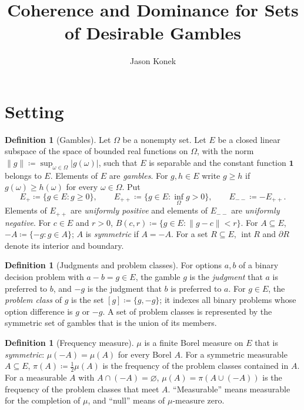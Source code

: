 \documentclass[11pt]{article}
\title{Coherence and Dominance for Sets of Desirable Gambles}
\author{Jason Konek}
\date{}
\theoremstyle{definition}
\newtheorem{definition}[theorem]{Definition}
\newcommand{\one}{\mathbf 1}
\newcommand{\interior}{\operatorname{int}}
\newcommand{\bd}{\partial}
\begin{document}
\maketitle


\section{Setting}\label{sec:setting}

\begin{definition}[Gambles]\label{def:gambles}
Let $\Omega$ be a nonempty set. Let $E$ be a closed linear subspace of the space of bounded real functions on $\Omega$, with the norm $\|g\|\coloneqq\sup_{\omega\in\Omega}|g(\omega)|$, such that $E$ is separable and the constant function $\one$ belongs to $E$. Elements of $E$ are \emph{gambles}. For $g,h\in E$ write $g\ge h$ if $g(\omega)\ge h(\omega)$ for every $\omega\in\Omega$. Put
\[
E_+\coloneqq\{g\in E:g\ge0\},\qquad E_{++}\coloneqq\{g\in E:\inf_{\Omega}g>0\},\qquad E_{--}\coloneqq -E_{++}.
\]
Elements of $E_{++}$ are \emph{uniformly positive} and elements of $E_{--}$ are \emph{uniformly negative}. For $c\in E$ and $r>0$, $B(c,r)\coloneqq\{g\in E:\|g-c\|<r\}$. For $A\subseteq E$, $-A\coloneqq\{-g:g\in A\}$; $A$ is \emph{symmetric} if $A=-A$. For a set $R\subseteq E$, $\interior R$ and $\bd R$ denote its interior and boundary.
\end{definition}

\begin{definition}[Judgments and problem classes]\label{def:judgments}
For options $a,b$ of a binary decision problem with $a-b=g\in E$, the gamble $g$ is the \emph{judgment} that $a$ is preferred to $b$, and $-g$ is the judgment that $b$ is preferred to $a$. For $g\in E$, the \emph{problem class} of $g$ is the set $[g]\coloneqq\{g,-g\}$; it indexes all binary problems whose option difference is $g$ or $-g$. A set of problem classes is represented by the symmetric set of gambles that is the union of its members.
\end{definition}

\begin{definition}[Frequency measure]\label{def:frequency}
$\mu$ is a finite Borel measure on $E$ that is \emph{symmetric}: $\mu(-A)=\mu(A)$ for every Borel $A$. For a symmetric measurable $A\subseteq E$, $\pi(A)\coloneqq\tfrac12\mu(A)$ is the frequency of the problem classes contained in $A$. For a measurable $A$ with $A\cap(-A)=\varnothing$, $\mu(A)=\pi(A\cup(-A))$ is the frequency of the problem classes that meet $A$. ``Measurable'' means measurable for the completion of $\mu$, and ``null'' means of $\mu$-measure zero.
\end{definition}
\end{document}
